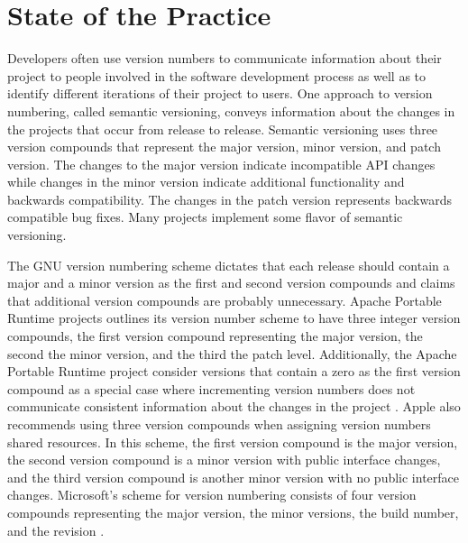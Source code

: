 \documentclass[conference]{IEEEtran}
\begin{document}
\section{State of the Practice}
\label{sec:Practice}


Developers often use version numbers to communicate information about their project to people involved in the software development process as well as to identify different iterations of their project to users.
One approach to version numbering, called semantic versioning, conveys information about the changes in the projects that occur from release to release. 
Semantic versioning uses three version compounds that represent the major version, minor version, and patch version.
The changes to the major version indicate incompatible API changes while changes in the minor version indicate additional functionality and backwards compatibility.
The changes in the patch version represents backwards compatible bug fixes\cite{SemanticVersioning}.
Many projects implement some flavor of semantic versioning.


The GNU version numbering scheme dictates that each release should contain a major and a minor version as the first and second version compounds and claims that additional version compounds are probably unnecessary\cite{GNUVersionNumbering}.
Apache Portable Runtime projects outlines its version number scheme to have three integer version compounds, the first version compound representing the major version, the second the minor version, and the third the patch level.
Additionally, the Apache Portable Runtime project consider versions that contain a zero as the first version compound as a special case where incrementing version numbers does not communicate consistent information about the changes in the project \cite{ApacheVersionNumbering}.
Apple also recommends using three version compounds when assigning version numbers shared resources.
In this scheme, the first version compound is the major version, the second version compound is a minor version with public interface changes, and the third version compound is another minor version with no public interface changes\cite{AppleVersionNumbering}.
Microsoft's scheme for version numbering consists of four version compounds representing the major version, the minor versions, the build number, and the revision \cite{MSVersionNumbering}.
\end{document}
